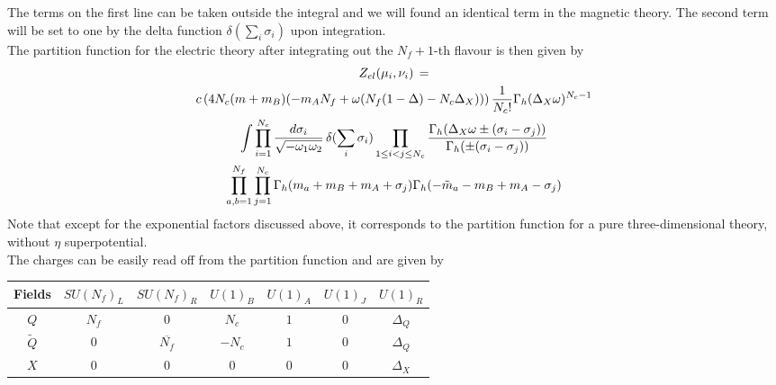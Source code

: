 The terms on the first line can be taken outside the integral and we will found an identical term in the magnetic theory.
The second term will be set to one by the delta function $\delta(\sum_i \sigma_i)$ upon integration.\\
The partition function for the electric theory after integrating out the $N_f +1$-th flavour is then given by
\begin{multline}
 Z_{el} ( \mu_i , \nu_i )\,  =  \\
 c \left( 4 N_c  ( m  + m_B ) (-  m_A N_f   + \omega ( N_f (1 - \Delta)  - N_c \Delta_X ) ) \right) 
 {1 \over N_c ! }
\Gamma_h ( \Delta_X \omega )^{N_c-1} 
\\ \int
\prod_{i=1}^{N_c} \frac{d \sigma_i}{\sqrt{- \omega_1 \omega_2}} \, \delta( \sum_i \sigma_i)  
	 \prod_{ 1 \leq i<j \leq N_c} \frac{ \Gamma_h( \Delta_X \omega \pm (\sigma_i - \sigma_j)) }{ \Gamma_h ( \pm (\sigma_i - \sigma_j) )}\\
 \prod_{a,b=1}^{N_f} \prod_{j=1}^{N_c} \Gamma_h ( m_a + m_B + m_A + \sigma_j) \Gamma_h ( -\tilde{m}_a -m_B + m_A - \sigma_j)
\end{multline}
Note that except for the exponential factors discussed above, it corresponds to the partition function for a pure three-dimensional theory, without $\eta$ superpotential.\\
The charges can be easily read off from the partition function and are given by 
\begin{table}[h!]
 \begin{tabular}{|c |c |c |c |c |c |c |}
\hline
Fields & $SU(N_f)_L$ & $SU(N_f)_R$ & $U(1)_B$ & $U(1)_A$ & $U(1)_J$ & $U(1)_R $ \\
\hline
$Q$ & $N_f$ & 0  &$ N_c $& $1 $& 0  & $\Delta_Q$ \\
$\tilde{Q} $  & 0  &$\overline{N_f}$ & $ - N_c $& $1 $ & 0 & $\Delta_Q$ \\
$X$ & 0 & 0 & 0 & 0 &0 & $\Delta_X$ \\
\hline
\end{tabular}
\centering
\end{table}






































